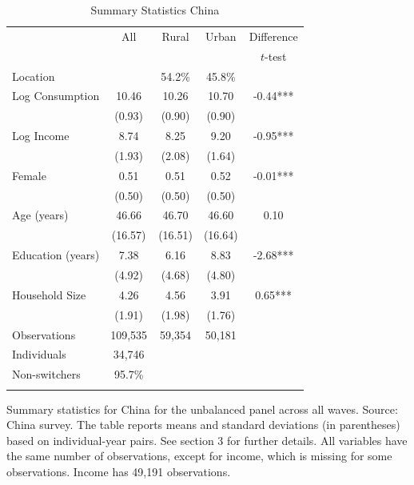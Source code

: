 \begin{table}[h!] \centering \caption{Summary Statistics China}\label{tab:summary_stats_CHN_unb} \begin{threeparttable} \begin{tabular}{l cccc} \toprule
& All & Rural & Urban & Difference \\
 &  &  &  & $t$-test \\
\midrule
Location &  &   54.2\% &   45.8\% &  \\  \addlinespace \addlinespace
Log Consumption & 10.46 & 10.26 & 10.70 & -0.44*** \\
 & (0.93) & (0.90) & (0.90) &  \\  \addlinespace
Log Income & 8.74 & 8.25 & 9.20 & -0.95*** \\
 & (1.93) & (2.08) & (1.64) &  \\  \addlinespace
Female & 0.51 & 0.51 & 0.52 & -0.01*** \\
 & (0.50) & (0.50) & (0.50) &  \\  \addlinespace
Age (years) & 46.66 & 46.70 & 46.60 & 0.10 \\
 & (16.57) & (16.51) & (16.64) &  \\  \addlinespace
Education (years) & 7.38 & 6.16 & 8.83 & -2.68*** \\
 & (4.92) & (4.68) & (4.80) &  \\  \addlinespace
Household Size & 4.26 & 4.56 & 3.91 & 0.65*** \\
 & (1.91) & (1.98) & (1.76) &  \\  \addlinespace


\cmidrule{2-5}
Observations & 109,535 & 59,354 & 50,181 &  \\  
Individuals & 34,746 &  &  &  \\
Non-switchers &   95.7\% &  &  &  \\  \addlinespace
\bottomrule \end{tabular} \begin{tablenotes}[flushleft] \footnotesize \item{Summary statistics for China for the unbalanced panel across all waves. Source: China survey. The table reports means and standard deviations (in parentheses) based on individual-year pairs. See section 3 for further details. All variables have the same number of observations, except for income, which is missing for some observations. Income has 49,191 observations.} \end{tablenotes} \end{threeparttable} \end{table}